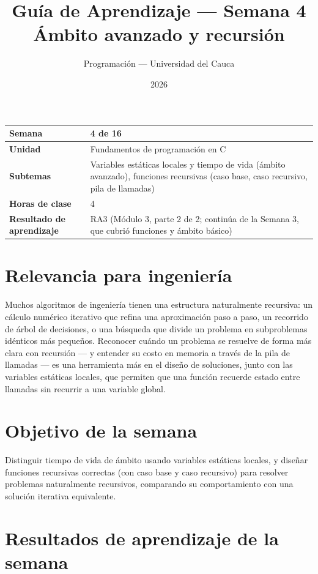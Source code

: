 \documentclass[11pt,letterpaper]{article}
\title{\textcolor{unicaucaverde}{\Large Guía de Aprendizaje --- Semana 4}\\[4pt]
  \large Ámbito avanzado y recursión}
\author{Programación --- Universidad del Cauca}
\date{2026}
\begin{document}
\maketitle

\begin{center}
\begin{tabular}{|>{\bfseries}p{4cm}|p{10cm}|}
\hline
Semana & 4 de 16 \\ \hline
Unidad & Fundamentos de programación en C \\ \hline
Subtemas & Variables estáticas locales y tiempo de vida (ámbito avanzado), funciones recursivas
  (caso base, caso recursivo, pila de llamadas) \\ \hline
Horas de clase & 4 \\ \hline
Resultado de aprendizaje & RA3 (Módulo 3, parte 2 de 2; continúa de la Semana 3, que cubrió
  funciones y ámbito básico) \\ \hline
\end{tabular}
\end{center}

\section*{Relevancia para ingeniería}

Muchos algoritmos de ingeniería tienen una estructura naturalmente recursiva: un cálculo numérico
iterativo que refina una aproximación paso a paso, un recorrido de árbol de decisiones, o una
búsqueda que divide un problema en subproblemas idénticos más pequeños. Reconocer cuándo un
problema se resuelve de forma más clara con recursión --- y entender su costo en memoria a través
de la pila de llamadas --- es una herramienta más en el diseño de soluciones, junto con las
variables estáticas locales, que permiten que una función recuerde estado entre llamadas sin
recurrir a una variable global.

\section{Objetivo de la semana}

Distinguir tiempo de vida de ámbito usando variables estáticas locales, y diseñar funciones
recursivas correctas (con caso base y caso recursivo) para resolver problemas naturalmente
recursivos, comparando su comportamiento con una solución iterativa equivalente.

\section{Resultados de aprendizaje de la semana}
\end{document}
